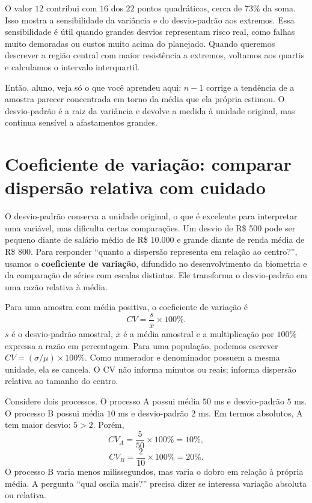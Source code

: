 O valor $12$ contribui com $16$ dos $22$ pontos quadráticos, cerca de $73\%$ da soma. Isso mostra a sensibilidade da variância e do desvio-padrão aos extremos. Essa sensibilidade é útil quando grandes desvios representam risco real, como falhas muito demoradas ou custos muito acima do planejado. Quando queremos descrever a região central com maior resistência a extremos, voltamos aos quartis e calculamos o intervalo interquartil.

\begin{SummaryBox}
Então, aluno, veja só o que você aprendeu aqui: $n-1$ corrige a tendência de a amostra parecer concentrada em torno da média que ela própria estimou. O desvio-padrão é a raiz da variância e devolve a medida à unidade original, mas continua sensível a afastamentos grandes.
\end{SummaryBox}

\section{Coeficiente de variação: comparar dispersão relativa com cuidado}

O desvio-padrão conserva a unidade original, o que é excelente para interpretar uma variável, mas dificulta certas comparações. Um desvio de R\$ 500 pode ser pequeno diante de salário médio de R\$ 10.000 e grande diante de renda média de R\$ 800. Para responder ``quanto a dispersão representa em relação ao centro?'', usamos o \textbf{coeficiente de variação}, difundido no desenvolvimento da biometria e da comparação de séries com escalas distintas. Ele transforma o desvio-padrão em uma razão relativa à média.

Para uma amostra com média positiva, o coeficiente de variação é
\[
CV=\frac{s}{\bar{x}}\times100\%.
\]
$s$ é o desvio-padrão amostral, $\bar{x}$ é a média amostral e a multiplicação por $100\%$ expressa a razão em percentagem. Para uma população, podemos escrever $CV=(\sigma/\mu)\times100\%$. Como numerador e denominador possuem a mesma unidade, ela se cancela. O CV não informa minutos ou reais; informa dispersão relativa ao tamanho do centro.

Considere dois processos. O processo A possui média $50$ ms e desvio-padrão $5$ ms. O processo B possui média $10$ ms e desvio-padrão $2$ ms. Em termos absolutos, A tem maior desvio: $5>2$. Porém,
\[
CV_A=\frac{5}{50}\times100\%=10\%,
\]
\[
CV_B=\frac{2}{10}\times100\%=20\%.
\]
O processo B varia menos milissegundos, mas varia o dobro em relação à própria média. A pergunta ``qual oscila mais?'' precisa dizer se interessa variação absoluta ou relativa.

